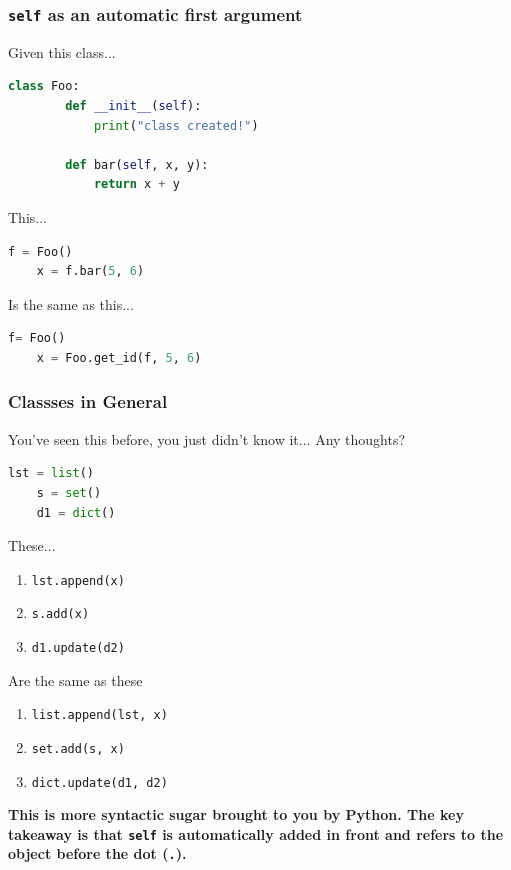 \documentclass{beamer}
\begin{document}
%
%
\begin{frame}[fragile]
    \frametitle{\lstinline|self| as an automatic first argument}
    Given this class...\\
    \vfill
    \begin{lstlisting}[language=python, autogobble]
    class Foo:
        def __init__(self):
            print("class created!")

        def bar(self, x, y):
            return x + y
    \end{lstlisting}
    \pause
    \vspace{0.5cm}
    This...
    \vfill
    \begin{lstlisting}[language=python, autogobble]
    f = Foo()
    x = f.bar(5, 6)
    \end{lstlisting}
    \pause
    \vspace{0.5cm}
    Is the same as this...\\
    \vfill
    \begin{lstlisting}[language=python, autogobble]
    f= Foo()
    x = Foo.get_id(f, 5, 6)
    \end{lstlisting}
\end{frame}

%
%
\begin{frame}[fragile]
    \frametitle{Classses in General}
    You've seen this before, you just didn't know it... Any thoughts?
    \pause
    \begin{lstlisting}[language=python, autogobble]
    lst = list()
    s = set()
    d1 = dict()
    \end{lstlisting}
    \vfill
    \begin{minipage}{0.49\textwidth}
        \pause
        These...
        \begin{enumerate}
            \item \lstinline|lst.append(x)|
            \item \lstinline|s.add(x)|
            \item \lstinline|d1.update(d2)|
        \end{enumerate}
    \end{minipage}
    \hfill
    \begin{minipage}{0.49\textwidth}
        \pause
        Are the same as these
        \begin{enumerate}
            \item \lstinline|list.append(lst, x)|
            \item \lstinline|set.add(s, x)|
            \item \lstinline|dict.update(d1, d2)|
        \end{enumerate}
    \end{minipage}
    \vfill
    \pause
    \textbf{This is more syntactic sugar brought to you by Python. The key takeaway is that \lstinline|self| is automatically added in front and refers to the object before the dot (\lstinline|.|).}
\end{frame}
\end{document}
